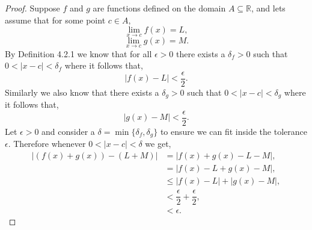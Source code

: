 \documentclass[12pt]{article}
\makeatletter
\theoremstyle{homework}
\newenvironment{exercise}[1]
{\def\@currentlabel{#1}\exercisecore}
{\endexercisecore}
\newcommand{\Reals}{\ensuremath{\mathbb R}}
\makeatother
\begin{document}
\begin{exercise}{Abbott 4.2.1 a,b}
\begin{enumerate}
  \begin{proof}  Suppose $f$ and $g$ are functions defined on the domain $A \subseteq \Reals$, and lets assume that 
    for some point $c \in A$,
    \begin{equation*}
      \lim_{x \to c} f(x) = L,
    \end{equation*} 
    \begin{equation*}
      \lim_{x \to c} g(x) = M.
    \end{equation*} 
    By Definition 4.2.1 we know that for all $\epsilon > 0$ there exists a $\delta_f>0$ such that $0 <|x - c|< \delta_f$
    where it follows that,
    \begin{equation*}
      |f(x) - L| < \dfrac{\epsilon}{2}.
    \end{equation*}
    Similarly we also know that there exists a $\delta_g > 0$ such that $0 <|x - c|< \delta_g$ where it follows that,
    \begin{equation*}
      |g(x) - M| < \dfrac{\epsilon}{2}.
    \end{equation*}
    Let $\epsilon > 0$ and consider a $\delta = \min\{\delta_f, \delta_g\}$ to ensure we can fit inside the tolerance $\epsilon$. Therefore whenever $0 <|x - c|< \delta$ we get,
    \begin{align*}
      |(f(x) + g(x)) - (L + M)| &= |f(x) + g(x)  - L - M|,\\
      &= |f(x)- L + g(x) - M|,\\
      &\leq |f(x)- L| + |g(x) - M|,\\
      &< \dfrac{\epsilon}{2} + \dfrac{\epsilon}{2},\\
      &< \epsilon. 
    \end{align*}
  \end{proof}
\end{enumerate}
\end{exercise}
\vspace{.5in} 
\end{document}
